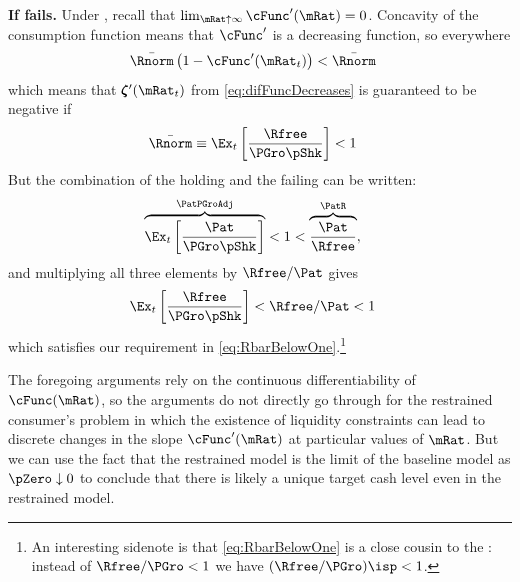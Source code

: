 \documentclass[BufferStockTheory]{subfiles}
\begin{document}
\textbf{If {\RIC} fails.}
Under \cncl{\RIC}, recall that $\lim_{\mRat \uparrow \infty} \cFunc^{\prime}(\mRat) = 0$.  Concavity of the consumption function means that $\cFunc^{\prime}$ is a decreasing function, so everywhere 
\begin{align*}
  \bar{\Rnorm}\left(1-\cFunc^{\prime}({\mRat}_t)\right) & < \bar{\Rnorm}
\end{align*}
which means that $\difFunc^{\prime}(\mRat_{t})$ from \eqref{eq:difFuncDecreases} is guaranteed to be negative if
\begin{align}
  \bar{\Rnorm} \equiv \Ex_{t}\left[\frac{\Rfree}{\PGro \pShk}\right] & < 1  \label{eq:RbarBelowOne}
\end{align}
But the combination of the {\GIC} holding and the {\RIC} failing can be written:
\begin{align*}
  \overbrace{\Ex_{t}\left[\frac{\Pat}{\PGro \pShk}\right]}^{\PatPGroAdj} & < 1 < \overbrace{\frac{\Pat}{\Rfree}}^{{\PatR}},
\end{align*}
and multiplying all three elements by $\Rfree/\Pat$ gives 
\begin{align*}
  \Ex_{t}\left[\frac{\Rfree}{\PGro \pShk}\right] & < \Rfree/\Pat < 1
\end{align*}
which satisfies our requirement in \eqref{eq:RbarBelowOne}.\footnote{An interesting sidenote is that \eqref{eq:RbarBelowOne} is a close cousin to the {\FHWC}: instead of $\Rfree/\PGro < 1$ we have $(\Rfree/\PGro)\isp < 1$.}



The foregoing arguments rely on the continuous differentiability of
$\cFunc(\mRat)$, so the arguments do not directly go through for the
restrained consumer's problem in which the existence of liquidity
constraints can lead to discrete changes in the slope
$\cFunc^{\prime}(\mRat)$ at particular values of $\mRat$. But we can
use the fact that the restrained model is the limit of the baseline
model as $\pZero \downarrow 0$ to conclude that there is likely a
unique target cash level even in the restrained model.
\end{document}
